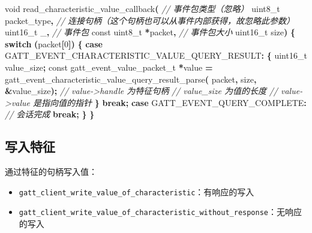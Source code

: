 \documentclass[
  12pt,
]{book}
\newenvironment{Shaded}{\begin{snugshade}}{\end{snugshade}}
\newcommand{\CommentTok}[1]{\textcolor[rgb]{0.56,0.35,0.01}{\textit{#1}}}
\newcommand{\ControlFlowTok}[1]{\textcolor[rgb]{0.13,0.29,0.53}{\textbf{#1}}}
\newcommand{\DataTypeTok}[1]{\textcolor[rgb]{0.13,0.29,0.53}{#1}}
\newcommand{\DecValTok}[1]{\textcolor[rgb]{0.00,0.00,0.81}{#1}}
\newcommand{\NormalTok}[1]{#1}
\newcommand{\OperatorTok}[1]{\textcolor[rgb]{0.81,0.36,0.00}{\textbf{#1}}}
\providecommand{\tightlist}{%
  \setlength{\itemsep}{0pt}\setlength{\parskip}{0pt}}
\begin{document}
\begin{Shaded}
\begin{Highlighting}[]
\DataTypeTok{void}\NormalTok{ read\_characteristic\_value\_callback}\OperatorTok{(}
  \CommentTok{// 事件包类型（忽略）}
  \DataTypeTok{uint8\_t}\NormalTok{ packet\_type}\OperatorTok{,}
  \CommentTok{// 连接句柄（这个句柄也可以从事件内部获得，故忽略此参数）}
  \DataTypeTok{uint16\_t}\NormalTok{ \_}\OperatorTok{,}
  \CommentTok{// 事件包}
  \DataTypeTok{const} \DataTypeTok{uint8\_t} \OperatorTok{*}\NormalTok{packet}\OperatorTok{,}
  \CommentTok{// 事件包大小}
  \DataTypeTok{uint16\_t}\NormalTok{ size}\OperatorTok{)}
\OperatorTok{\{}
    \ControlFlowTok{switch} \OperatorTok{(}\NormalTok{packet}\OperatorTok{[}\DecValTok{0}\OperatorTok{])}
    \OperatorTok{\{}
    \ControlFlowTok{case}\NormalTok{ GATT\_EVENT\_CHARACTERISTIC\_VALUE\_QUERY\_RESULT}\OperatorTok{:}
        \OperatorTok{\{}
            \DataTypeTok{uint16\_t}\NormalTok{ value\_size}\OperatorTok{;}
            \DataTypeTok{const}\NormalTok{ gatt\_event\_value\_packet\_t }\OperatorTok{*}\NormalTok{value }\OperatorTok{=}
\NormalTok{                gatt\_event\_characteristic\_value\_query\_result\_parse}\OperatorTok{(}
\NormalTok{                  packet}\OperatorTok{,}\NormalTok{ size}\OperatorTok{,} \OperatorTok{\&}\NormalTok{value\_size}\OperatorTok{);}
            \CommentTok{// value{-}\textgreater{}handle 为特征句柄}
            \CommentTok{// value\_size 为值的长度}
            \CommentTok{// value{-}\textgreater{}value 是指向值的指针}
        \OperatorTok{\}}
        \ControlFlowTok{break}\OperatorTok{;}
    \ControlFlowTok{case}\NormalTok{ GATT\_EVENT\_QUERY\_COMPLETE}\OperatorTok{:}
        \CommentTok{// 会话完成}
        \ControlFlowTok{break}\OperatorTok{;}
    \OperatorTok{\}}
\OperatorTok{\}}
\end{Highlighting}
\end{Shaded}

\hypertarget{ux5199ux5165ux7279ux5f81}{%
\subsection{写入特征}\label{ux5199ux5165ux7279ux5f81}}

通过特征的句柄写入值：

\begin{itemize}
\tightlist
\item
  \texttt{gatt\_client\_write\_value\_of\_characteristic}：有响应的写入
\item
  \texttt{gatt\_client\_write\_value\_of\_characteristic\_without\_response}：无响应的写入
\end{itemize}
\end{document}
